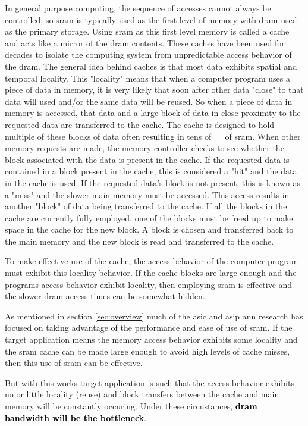 In general purpose computing, the sequence of accesses cannot always be controlled, so \ac{sram} is typically used as the first level of memory with \ac{dram} used as the primary storage. 
Using \ac{sram} as this first level memory is called a cache and acts like a mirror of the \ac{dram} contents.
These caches have been used for decades to isolate the computing system from unpredictable access behavior of the \ac{dram}.
The general idea behind caches is that most data exhibits spatial and temporal locality. This "locality" means that when a computer program uses a piece of data in memory, it is very likely that soon after other data "close" to that data will used and/or the same data will be reused.
So when a piece of data in memory is accessed, that data and a large block of data in close proximity to the requested data are transferred to the cache. 
The cache is designed to hold multiple of these blocks of data often resulting in tens of \SI[per-mode=symbol]{}{\kilo \byte} of \ac{sram}.
When other memory requests are made, the memory controller checks to see whether the block associated with the data is present in the cache.
If the requested data is contained in a block present in the cache, this is considered a "hit" and the data in the cache is used. 
If the requested data's block is not present, this is known as a "miss" and the slower main memory must be accessed. This access results in another "block" of data being transferred to the cache.
If all the blocks in the cache are currently fully employed, one of the blocks must be freed up to make space in the cache for the new block. 
A block is chosen and transferred back to the main memory and the new block is read and transferred to the cache.

To make effective use of the cache, the access behavior of the computer program must exhibit this locality behavior. 
If the cache blocks are large enough and the programs access behavior exhibit locality, then employing \ac{sram} is effective and the slower \ac{dram} access times can be somewhat hidden.

As mentioned in section \ref{sec:overview} much of the \ac{asic} and \ac{asip} \ac{ann} research has focused on taking advantage of the performance and ease of use of \ac{sram}. 
If the target application means the memory access behavior exhibits some locality and the \ac{sram} cache can be made large enough to avoid high levels of cache misses, then this use of \ac{sram} can be effective.

But with this works target application is such that the access behavior exhibits no or little locality (reuse) and block transfers between the cache and main memory will be constantly occuring.
Under these circustances, \textbf{\textcolor{black}{\ac{dram} bandwidth will be the bottleneck}}.

